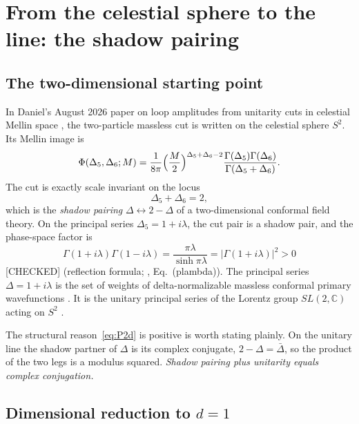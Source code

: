 \documentclass[11pt,a4paper]{article}
\theoremstyle{plain}
\theoremstyle{definition}
\theoremstyle{remark}
\newcommand{\C}{\mathbb{C}}
\newcommand{\lab}[1]{\textsf{\small[#1]}}
\newcommand{\CHECKED}{\lab{CHECKED}}
\begin{document}
\section{From the celestial sphere to the line: the shadow pairing}
\label{sec:reduction}

\subsection{The two-dimensional starting point}

In Daniel's August 2026 paper on loop amplitudes from unitarity cuts in
celestial Mellin space \cite{ToupinLoops2026}, the two-particle massless cut
is written on the celestial sphere $S^2$. Its Mellin image is
\begin{equation}\label{eq:phi2d}
\Phi(\Delta_5,\Delta_6;M)=\frac1{8\pi}\Bigl(\frac M2\Bigr)^{\Delta_5+\Delta_6-2}
\frac{\Gamma(\Delta_5)\Gamma(\Delta_6)}{\Gamma(\Delta_5+\Delta_6)} .
\end{equation}
The cut is exactly scale invariant on the locus
\[
\Delta_5+\Delta_6=2 ,
\]
which is the \emph{shadow pairing} $\Delta\leftrightarrow 2-\Delta$ of a
two-dimensional conformal field theory. On the principal series
$\Delta_5=1+i\lambda$, the cut pair is a shadow pair, and the phase-space
factor is
\begin{equation}\label{eq:P2d}
\Gamma(1+i\lambda)\Gamma(1-i\lambda)=\frac{\pi\lambda}{\sinh\pi\lambda}
=\bigl|\Gamma(1+i\lambda)\bigr|^2>0
\end{equation}
\CHECKED{} (reflection formula; \cite{ToupinLoops2026}, Eq.~(plambda)). The
principal series $\Delta=1+i\lambda$ is the set of weights of
delta-normalizable massless conformal primary wavefunctions
\cite{PasterskiShaoStrominger2017}. It is the unitary principal series of the
Lorentz group $SL(2,\C)$ acting on $S^2$ \cite{Dobrev1977}.

The structural reason~\eqref{eq:P2d} is positive is worth stating plainly.
On the unitary line the shadow partner of $\Delta$ is its complex conjugate,
$2-\Delta=\bar\Delta$, so the product of the two legs is a modulus squared.
\emph{Shadow pairing plus unitarity equals complex conjugation.}

\subsection{Dimensional reduction to $d=1$}
\end{document}
